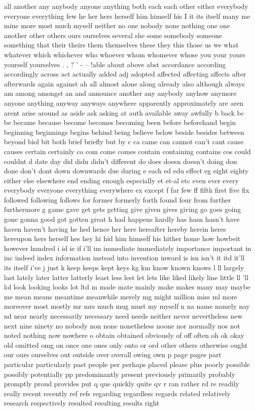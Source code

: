 \documentclass{article}
\begin{document}
\begin{framed}
\scriptsize
all another any anybody anyone anything both each each other either everybody everyone everything few he her hers herself him himself his I it its itself many me mine more most much myself neither no one nobody none nothing one one another other others ours ourselves several she some somebody someone something that their theirs them themselves these they this those us we what whatever which whichever who whoever whom whomever whose you your yours yourself yourselves . , ? ' - -- !able about above abst accordance according accordingly across act actually added adj adopted affected affecting affects after afterwards again against ah all almost alone along already also although always am among amongst an and announce another any anybody anyhow anymore anyone anything anyway anyways anywhere apparently approximately are aren arent arise around as aside ask asking at auth available away awfully b back bc be became because become becomes becoming been before beforehand begin beginning beginnings begins behind being believe below beside besides between beyond biol bit both brief briefly but by c ca came can cannot can't cant cause causes certain certainly co com come comes contain containing contains cos could couldnt d date day did didn didn't different do does doesn doesn't doing don done don't dont down downwards due during e each ed edu effect eg eight eighty either else elsewhere end ending enough especially et et-al etc even ever every everybody everyone everything everywhere ex except f far few ff fifth first five fix followed following follows for former formerly forth found four from further furthermore g game gave get gets getting give given gives giving go goes going gone gonna good got gotten great h had happens hardly has hasn hasn't have haven haven't having he hed hence her here hereafter hereby herein heres hereupon hers herself hes hey hi hid him himself his hither home how howbeit however hundred i id ie if i'll im immediate immediately importance important in inc indeed index information instead into invention inward is isn isn't it itd it'll its itself i've j just k keep keeps kept keys kg km know known knows l ll largely last lately later latter latterly least less lest let lets like liked likely line little ll 'll lol look looking looks lot ltd m made mate mainly make makes many may maybe me mean means meantime meanwhile merely mg might million miss ml more moreover most mostly mr mrs much mug must my myself n na name namely nay nd near nearly necessarily necessary need needs neither never nevertheless new next nine ninety no nobody non none nonetheless noone nor normally nos not noted nothing now nowhere o obtain obtained obviously of off often oh ok okay old omitted omg on once one ones only onto or ord other others otherwise ought our ours ourselves out outside over overall owing own p page pages part particular particularly past people per perhaps placed please plus poorly possible possibly potentially pp predominantly present previously primarily probably promptly proud provides put q que quickly quite qv r ran rather rd re readily really recent recently ref refs regarding regardless regards related relatively research respectively resulted resulting results right 
\end{framed}
\end{document}
